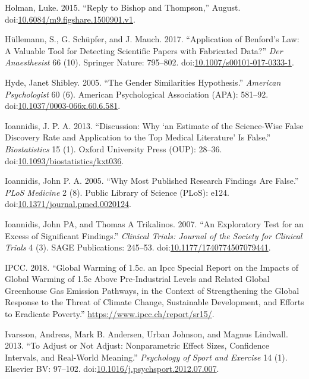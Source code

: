 \documentclass[a5paper]{book}
\begin{document}
\hypertarget{ref-doi:10.6084ux2fm9.figshare.1500901.v1}{}
Holman, Luke. 2015. ``Reply to Bishop and Thompson,'' August.
doi:\href{https://doi.org/10.6084/m9.figshare.1500901.v1}{10.6084/m9.figshare.1500901.v1}.

\hypertarget{ref-doi:10.1007ux2fs00101-017-0333-1}{}
Hüllemann, S., G. Schüpfer, and J. Mauch. 2017. ``Application of
Benford's Law: A Valuable Tool for Detecting Scientific Papers with
Fabricated Data?'' \emph{Der Anaesthesist} 66 (10). Springer Nature:
795--802.
doi:\href{https://doi.org/10.1007/s00101-017-0333-1}{10.1007/s00101-017-0333-1}.

\hypertarget{ref-doi:10.1037ux2f0003-066x.60.6.581}{}
Hyde, Janet Shibley. 2005. ``The Gender Similarities Hypothesis.''
\emph{American Psychologist} 60 (6). American Psychological Association
(APA): 581--92.
doi:\href{https://doi.org/10.1037/0003-066x.60.6.581}{10.1037/0003-066x.60.6.581}.

\hypertarget{ref-doi:10.1093ux2fbiostatisticsux2fkxt036}{}
Ioannidis, J. P. A. 2013. ``Discussion: Why `an Estimate of the
Science-Wise False Discovery Rate and Application to the Top Medical
Literature' Is False.'' \emph{Biostatistics} 15 (1). Oxford University
Press (OUP): 28--36.
doi:\href{https://doi.org/10.1093/biostatistics/kxt036}{10.1093/biostatistics/kxt036}.

\hypertarget{ref-doi:10.1371ux2fjournal.pmed.0020124}{}
Ioannidis, John P. A. 2005. ``Why Most Published Research Findings Are
False.'' \emph{PLoS Medicine} 2 (8). Public Library of Science (PLoS):
e124.
doi:\href{https://doi.org/10.1371/journal.pmed.0020124}{10.1371/journal.pmed.0020124}.

\hypertarget{ref-doi:10.1177ux2f1740774507079441}{}
Ioannidis, John PA, and Thomas A Trikalinos. 2007. ``An Exploratory Test
for an Excess of Significant Findings.'' \emph{Clinical Trials: Journal
of the Society for Clinical Trials} 4 (3). SAGE Publications: 245--53.
doi:\href{https://doi.org/10.1177/1740774507079441}{10.1177/1740774507079441}.

\hypertarget{ref-ipccGlobalWarmingIPCC2018}{}
IPCC. 2018. ``Global Warming of 1.5c. an Ipcc Special Report on the
Impacts of Global Warming of 1.5c Above Pre-Industrial Levels and
Related Global Greenhouse Gas Emission Pathways, in the Context of
Strengthening the Global Response to the Threat of Climate Change,
Sustainable Development, and Efforts to Eradicate Poverty.''
\url{https://www.ipcc.ch/report/sr15/}.

\hypertarget{ref-doi:10.1016ux2fj.psychsport.2012.07.007}{}
Ivarsson, Andreas, Mark B. Andersen, Urban Johnson, and Magnus Lindwall.
2013. ``To Adjust or Not Adjust: Nonparametric Effect Sizes, Confidence
Intervals, and Real-World Meaning.'' \emph{Psychology of Sport and
Exercise} 14 (1). Elsevier BV: 97--102.
doi:\href{https://doi.org/10.1016/j.psychsport.2012.07.007}{10.1016/j.psychsport.2012.07.007}.
\end{document}
